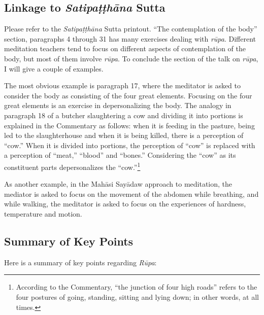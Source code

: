 \subsection*{Linkage to \textit{Satipaṭṭhāna} Sutta}

Please refer to the \textit{Satipaṭṭhāna} Sutta printout. “The contemplation of the body” section, paragraphs 4 through 31 has many exercises dealing with \textit{rūpa}. Different meditation teachers tend to focus on different aspects of contemplation of the body, but most of them involve \textit{rūpa}. To conclude the section of the talk on \textit{rūpa}, I will give a couple of examples.

The most obvious example is paragraph 17, where the meditator is asked to consider the body as consisting of the four great elements. Focusing on the four great elements is an exercise in depersonalizing the body. The analogy in paragraph 18 of a butcher slaughtering a cow and dividing it into portions is explained in the Commentary as follows: when it is feeding in the pasture, being led to the slaughterhouse and when it is being killed, there is a perception of “cow.” When it is divided into portions, the perception of “cow” is replaced with a perception of “meat,” “blood” and “bones.” Considering the “cow” as its constituent parts depersonalizes the “cow.”\footnote{According to the Commentary, “the junction of four high roads” refers to the four postures of going, standing, sitting and lying down; in other words, at all times.}

As another example, in the Mahāsi Sayādaw approach to meditation, the mediator is asked to focus on the movement of the abdomen while breathing, and while walking, the meditator is asked to focus on the experiences of hardness, temperature and motion.

\subsection*{Summary of Key Points}

Here is a summary of key points regarding \textit{Rūpa}:

